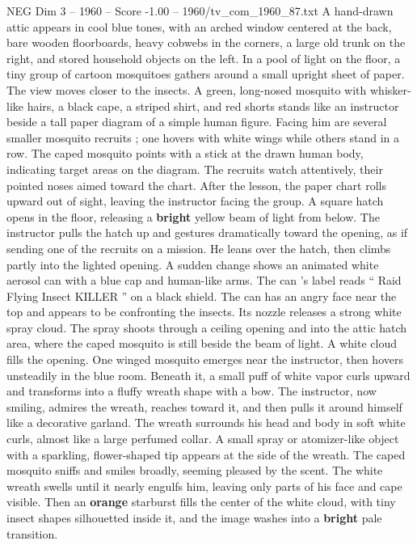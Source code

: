 \begin{textsample}{NEG Dim 3 – 1960 – Score -1.00 – 1960/tv\_com\_1960\_87.txt}  \label{ex:f3_neg_079}
A hand-drawn attic appears in cool blue tones, with an arched window centered at the back, bare wooden floorboards, heavy cobwebs in the corners, a large old trunk on the right, and stored household objects on the left.
In a pool of light on the floor, a tiny group of cartoon mosquitoes gathers around a small upright sheet of paper.
The view moves closer to the insects.
A green, long-nosed mosquito with whisker-like hairs, a black cape, a striped shirt, and red shorts stands like an instructor beside a tall paper diagram of a simple human figure.
Facing him are several smaller mosquito recruits ; one hovers with white wings while others stand in a row.
The caped mosquito points with a stick at the drawn human body, indicating target areas on the diagram.
The recruits watch attentively, their pointed noses aimed toward the chart.
After the lesson, the paper chart rolls upward out of sight, leaving the instructor facing the group.
A square hatch opens in the floor, releasing a \textbf{bright} yellow beam of light from below.
The instructor pulls the hatch up and gestures dramatically toward the opening, as if sending one of the recruits on a mission.
He leans over the hatch, then climbs partly into the lighted opening.
A sudden change shows an animated white aerosol can with a blue cap and human-like arms.
The can ’s label reads “ Raid Flying Insect KILLER ” on a black shield.
The can has an angry face near the top and appears to be confronting the insects.
Its nozzle releases a strong white spray cloud.
The spray shoots through a ceiling opening and into the attic hatch area, where the caped mosquito is still beside the beam of light.
A white cloud fills the opening.
One winged mosquito emerges near the instructor, then hovers unsteadily in the blue room.
Beneath it, a small puff of white vapor curls upward and transforms into a fluffy wreath shape with a bow.
The instructor, now smiling, admires the wreath, reaches toward it, and then pulls it around himself like a decorative garland.
The wreath surrounds his head and body in soft white curls, almost like a large perfumed collar.
A small spray or atomizer-like object with a sparkling, flower-shaped tip appears at the side of the wreath.
The caped mosquito sniffs and smiles broadly, seeming pleased by the scent.
The white wreath swells until it nearly engulfs him, leaving only parts of his face and cape visible.
Then an \textbf{orange} starburst fills the center of the white cloud, with tiny insect shapes silhouetted inside it, and the image washes into a \textbf{bright} pale transition.

\end{textsample}
